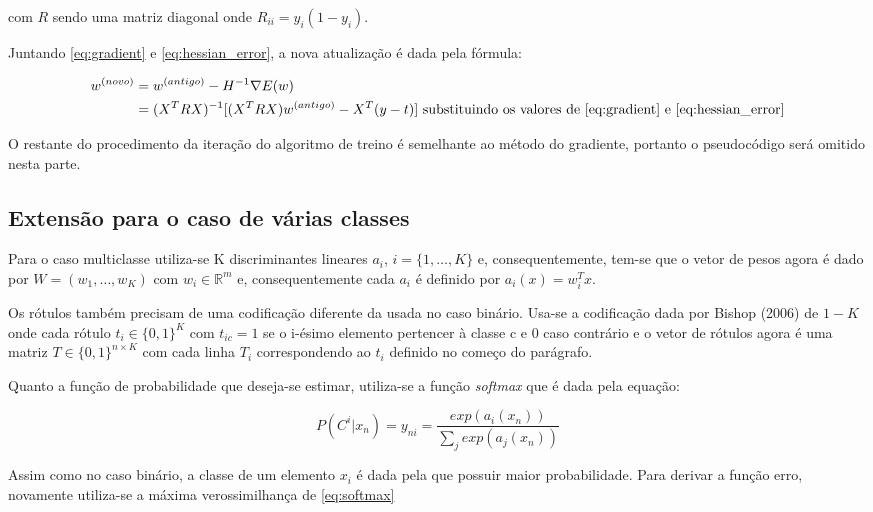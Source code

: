 com $R$ sendo uma matriz diagonal onde $R_{ii} = y_i(1 - y_i)$.

Juntando \ref{eq:gradient} e \ref{eq:hessian_error}, a nova atualização é dada pela fórmula:


\begin{equation}
	\begin{split}
		w^{ (novo) } & = w^{ (antigo) } - H^{-1} \nabla E(w) \\
		& = (X^T R X)^{-1}[(X^T R X)w^{ (antigo) } - X^T(y - t)] \text{ substituindo os valores de \ref{eq:gradient} e \ref{eq:hessian_error}} 
	\end{split}
\end{equation}

O restante do procedimento da iteração do algoritmo de treino é semelhante ao método do gradiente,
portanto o pseudocódigo será omitido nesta parte.

\subsection{Extensão para o caso de várias classes}

Para o caso multiclasse utiliza-se K discriminantes lineares $a_i$, $i = \{1, \ldots, K\}$ e,
consequentemente, tem-se que o vetor de pesos agora é dado por $W = (w_1, \ldots, w_K)$ com
$w_i \in \mathbb{R}^m$ e, consequentemente cada $a_i$ é definido por $a_i(x) = w_i^Tx$.

Os rótulos também precisam de uma codificação diferente da usada no caso binário. Usa-se a codificação
dada por Bishop (2006)\cite{bishop2006} de $1-K$ onde cada rótulo $t_i \in \{0, 1\}^K$ com
$t_{ic} = 1$ se o i-ésimo elemento pertencer à classe c e 0 caso contrário e o vetor de rótulos
agora é uma matriz $T \in \{0, 1\}^{n \times K}$ com cada linha $T_i$ correspondendo ao
$t_i$ definido no começo do parágrafo.

Quanto a função de probabilidade que deseja-se estimar, utiliza-se a função
\textit{softmax} que é dada pela equação:

\begin{center}
	\begin{equation}
		\label{eq:softmax}
		P(C^i | x_n) = y_{ni} = \frac{exp(a_i(x_n))}{\sum_j exp(a_j(x_n))} 
	\end{equation}
\end{center}

Assim como no caso binário, a classe de um elemento $x_i$ é dada pela que possuir maior probabilidade.
Para derivar a função erro, novamente utiliza-se a máxima verossimilhança de \ref{eq:softmax}

